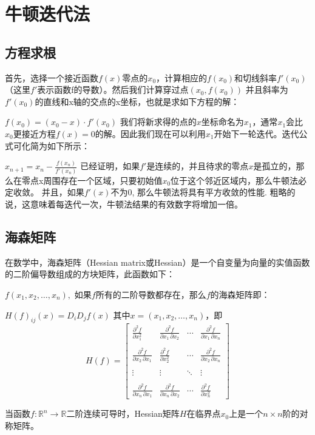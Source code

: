\documentclass[12pt]{article}
\begin{document}
\section{牛顿迭代法}
\subsection{方程求根}
首先，选择一个接近函数$f(x)$零点的$x_0$，计算相应的$f(x_0)$和切线斜率$f'(x_0)$（这里$f'$表示函数f的导数）。然后我们计算穿过点$(x_0, f(x_0))$ 并且斜率为$f'(x_0)$的直线和x轴的交点的x坐标，也就是求如下方程的解：

$f(x_0)= (x_0-x)\cdot f'(x_0)$
我们将新求得的点的$x$坐标命名为$x_1$，通常$x_1$会比$x_0$更接近方程$f(x)=0$的解。因此我们现在可以利用$x_1$开始下一轮迭代。迭代公式可化简为如下所示：

$x_{n+1} = x_n - \frac{f(x_n)}{f'(x_n)}$
已经证明，如果$f'$是连续的，并且待求的零点$x$是孤立的，那么在零点x周围存在一个区域，只要初始值$x_0$位于这个邻近区域内，那么牛顿法必定收敛。 并且，如果$f'(x)$不为0, 那么牛顿法将具有平方收敛的性能. 粗略的说，这意味着每迭代一次，牛顿法结果的有效数字将增加一倍。
\subsection{海森矩阵}
在数学中，海森矩阵（Hessian matrix或Hessian）是一个自变量为向量的实值函数的二阶偏导数组成的方块矩阵，此函数如下：

$f(x_1, x_2, \dots, x_n),$
如果$f$所有的二阶导数都存在，那么$f$的海森矩阵即：

$H(f)_{ij}(x) = D_i D_j f(x)$
其中$x = (x_1, x_2, \dots, x_n)$，即
$$
H(f) = \begin{bmatrix}
\frac{\partial^2 f}{\partial x_1^2} & \frac{\partial^2 f}{\partial x_1\,\partial x_2} & \cdots & \frac{\partial^2 f}{\partial x_1\,\partial x_n} \\  \\
\frac{\partial^2 f}{\partial x_2\,\partial x_1} & \frac{\partial^2 f}{\partial x_2^2} & \cdots & \frac{\partial^2 f}{\partial x_2\,\partial x_n} \\  \\
\vdots & \vdots & \ddots & \vdots \\  \\
\frac{\partial^2 f}{\partial x_n\,\partial x_1} & \frac{\partial^2 f}{\partial x_n\,\partial x_2} & \cdots & \frac{\partial^2 f}{\partial x_n^2}
\end{bmatrix}
$$

当函数$f: \mathbb{R}^n \to \mathbb{R}$二阶连续可导时，Hessian矩阵$H$在临界点$x_0$上是一个$n\times n$阶的对称矩阵。
\end{document}
